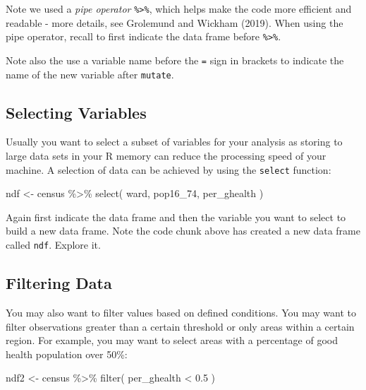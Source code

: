 \documentclass[
  letterpaper,
  DIV=11,
  numbers=noendperiod,
  oneside]{scrreprt}
\newenvironment{Shaded}{\begin{snugshade}}{\end{snugshade}}
\newcommand{\FloatTok}[1]{\textcolor[rgb]{0.68,0.00,0.00}{#1}}
\newcommand{\FunctionTok}[1]{\textcolor[rgb]{0.28,0.35,0.67}{#1}}
\newcommand{\NormalTok}[1]{\textcolor[rgb]{0.00,0.23,0.31}{#1}}
\newcommand{\OtherTok}[1]{\textcolor[rgb]{0.00,0.23,0.31}{#1}}
\newcommand{\SpecialCharTok}[1]{\textcolor[rgb]{0.37,0.37,0.37}{#1}}
\begin{document}
Note we used a \emph{pipe operator} \texttt{\%\textgreater{}\%}, which
helps make the code more efficient and readable - more details, see
Grolemund and Wickham (2019). When using the pipe operator, recall to
first indicate the data frame before \texttt{\%\textgreater{}\%}.

Note also the use a variable name before the \texttt{=} sign in brackets
to indicate the name of the new variable after \texttt{mutate}.

\subsection{Selecting Variables}\label{selecting-variables}

Usually you want to select a subset of variables for your analysis as
storing to large data sets in your R memory can reduce the processing
speed of your machine. A selection of data can be achieved by using the
\texttt{select} function:

\begin{Shaded}
\begin{Highlighting}[]
\NormalTok{ndf }\OtherTok{\textless{}{-}}\NormalTok{ census }\SpecialCharTok{\%\textgreater{}\%} 
  \FunctionTok{select}\NormalTok{( ward, pop16\_74, per\_ghealth )}
\end{Highlighting}
\end{Shaded}

Again first indicate the data frame and then the variable you want to
select to build a new data frame. Note the code chunk above has created
a new data frame called \texttt{ndf}. Explore it.

\subsection{Filtering Data}\label{filtering-data}

You may also want to filter values based on defined conditions. You may
want to filter observations greater than a certain threshold or only
areas within a certain region. For example, you may want to select areas
with a percentage of good health population over 50\%:

\begin{Shaded}
\begin{Highlighting}[]
\NormalTok{ndf2 }\OtherTok{\textless{}{-}}\NormalTok{ census }\SpecialCharTok{\%\textgreater{}\%} 
  \FunctionTok{filter}\NormalTok{( per\_ghealth }\SpecialCharTok{\textless{}} \FloatTok{0.5}\NormalTok{ )}
\end{Highlighting}
\end{Shaded}
\end{document}
